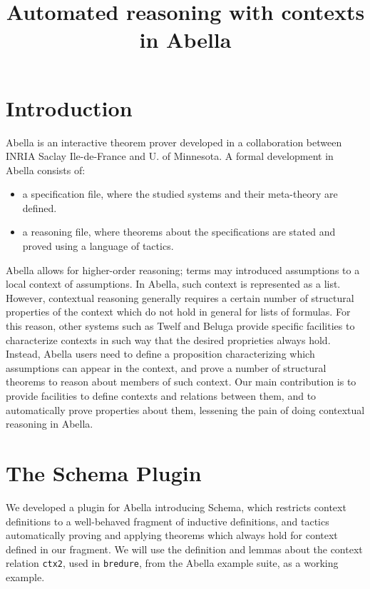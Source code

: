 \documentclass[nocopyrightspace,authoryear]{sigplanconf}
\title{Automated reasoning with contexts in Abella}
\begin{document}
\maketitle
\section{Introduction}

Abella \cite{abellasys} is an interactive theorem prover developed in a collaboration between INRIA Saclay Ile-de-France and U. of Minnesota. A formal development in Abella consists of:
\begin{itemize}
\item a specification file, where the studied systems and their meta-theory are defined.
\item a reasoning file, where theorems about the specifications are stated and proved using a language of tactics.
\end{itemize}

Abella allows for higher-order reasoning; terms may introduced assumptions to a local context of assumptions. In Abella, such context is represented as a list. However, contextual reasoning generally requires a certain number of structural properties of the context which do not hold in general for lists of formulas. For this reason, other systems such as Twelf \cite{twelfsys} and Beluga \cite{belugasys} provide specific facilities to characterize contexts in such way that the desired proprieties always hold. Instead, Abella users need to define a proposition characterizing which assumptions can appear in the context, and prove a number of structural theorems to reason about members of such context. Our main contribution is to provide facilities to define contexts and relations between them, and to automatically prove properties about them, lessening the pain of doing contextual reasoning in Abella.



\section{The Schema Plugin}

We developed a plugin for Abella introducing Schema, which restricts context definitions to a well-behaved fragment of inductive definitions, and tactics automatically proving and applying theorems which always hold for context defined in our fragment. We will use the definition and lemmas about the context relation \lstinline|ctx2|, used in \lstinline|bredure|, from the Abella example suite, as a working example.
\end{document}

